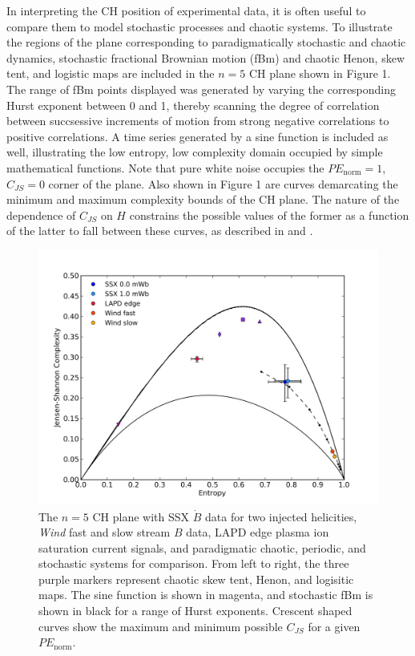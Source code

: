 \documentclass[aps,pre,twocolumn,secnumarabic,nobalancelastpage,amsmath,amssymb,
nofootinbib]{revtex4-1}
\begin{document}
In interpreting the CH position of experimental data, it is often useful to compare them to model  stochastic processes and chaotic systems. To illustrate the regions of the plane corresponding to paradigmatically stochastic and chaotic dynamics, stochastic fractional Brownian motion (fBm) and chaotic Henon, skew tent, and logistic maps are included in the $n=5$ CH plane shown in Figure 1. The range of fBm points displayed was generated by varying the corresponding Hurst exponent between 0 and 1, thereby scanning the degree of correlation between succsessive increments of motion from strong negative correlations to positive correlations. A time series generated by a sine function is included as well, illustrating the low entropy, low complexity domain occupied by simple mathematical functions. Note that pure white noise occupies the $PE_{\text{norm}}=1$, $C_{JS}=0$ corner of the plane. Also shown in Figure 1 are curves demarcating the minimum and maximum complexity bounds of the CH plane. The nature of the dependence of $C_{JS}$ on $H$ constrains the possible values of the former as a function of the latter to fall between these curves, as described in \cite{lopez1995} and \cite{calbet2001}.
\begin{figure}[!htbp]
\centerline{
\includegraphics[width=17cm]{fig1.png}}
\caption{\label{Figure 1} The $n=5$ CH plane  with SSX $\dot{B}$ data for two injected helicities, \textit{Wind} fast and slow stream $B$ data, LAPD edge plasma ion saturation current signals, and paradigmatic chaotic, periodic, and stochastic systems for comparison. From left to right, the three purple markers represent chaotic skew tent, Henon, and logisitic maps. The sine function is shown in magenta, and stochastic fBm is shown in black for a range of Hurst exponents. Crescent shaped curves show the maximum and minimum possible $C_{JS}$ for a given $PE_{\text{norm}}$.}
\end{figure}
\end{document}

